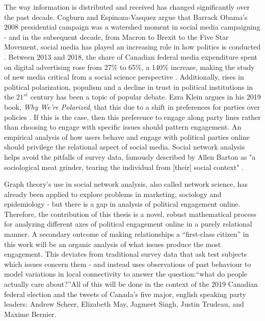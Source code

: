 The way information is distributed and received has changed significantly over
the past decade. Cogburn and Espinoza-Vasquez argue that Barrack Obama’s 2008
presidential campaign was a watershed moment in social media campaigning - and
in the subsequent decade, from Macron to Brexit to the Five Star Movement,
social media has played an increasing role in how politics is conducted
\cite{cogburn2011networked}. Between 2013 and 2018, the share of Canadian
federal media expenditure spent on digital advertising rose from 27\% to 65\%, a
140\% increase, making the study of new media critical from a social science
perspective \cite{annualReportCanadaAdvertisingActivities_2018}. Additionally,
rises in political polarization, populism and a decline in trust in political
institutions in the $21^{st}$ century has been a topic of popular debate. Ezra
Klein argues in his 2019 book, \emph{Why We're Polarized}, that this due to a
shift in preferences for parties over policies \cite{levitsky2018democracies}.
If this is the case, then this preference to engage along party lines rather
than choosing to engage with specific issues should pattern engagement. An
empirical analysis of how users behave and engage with political parties online
should privilege the relational aspect of social media. Social network analysis
helps avoid the pitfalls of survey data, famously described by Allen Barton as
"a sociological meat grinder, tearing the individual from [their] social
context" \cite{freeman2004development}.

Graph theory’s use in social network analysis, also called network science, has
already been applied to explore problems in marketing, sociology and
epidemiology - but there is a gap in analysis of political engagement online.
Therefore, the contribution of this thesis is a novel, robust mathematical
process for analyzing different axes of political engagement online in a purely
relational manner. A secondary outcome of making relationships a “first-class
citizen” in this work will be an organic analysis of what issues produce the
most engagement. This deviates from traditional survey data that ask test
subjects which issues concern them - and instead uses observations of past
behaviour to model variations in local connectivity to answer the question:“what
do people actually care about?”All of this will be done in the context of the
2019 Canadian federal election and the tweets of Canada's five major, english
speaking party leaders: Andrew Scheer, Elizabeth May, Jagmeet Singh, Justin
Trudeau, and Maxime Bernier. 

